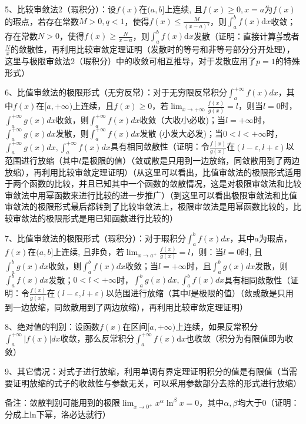 5、比较审敛法2（瑕积分）：设$f(x)$在$(a, b]$上连续, 且$f(x) \geqslant 0, x=a$为$f(x)$的瑕点，若存在常数$M>0, q<1$，使得$f(x) \leqslant \frac{M}{(x-a)^{q}}$，则$\int_{a}^{b} f(x) \mathrm{d} x$收敛；存在常数$N>0$，使得$f(x) \geqslant \frac{N}{x-a}$，则$\int_{a}^{b} f(x) \mathrm{d} x$发散（证明：直接计算$\frac{M}{x^{p}}$或者$\frac{N}{x}$的敛散性，再利用比较审敛定理证明（发散时的等号和非等号部分分开处理），这里与极限审敛法2（瑕积分）中的收敛可相互推导，对于发散应用了$p=1$的特殊形式）

6、比值审敛法的极限形式（无穷反常）：对于无穷限反常积分$\int_{a}^{+\infty} f(x) d x$，其中$f(x)$在$[{a},+\infty)$上连续，且$f(x) \geqslant 0$，若$\lim_{x \rightarrow+\infty} \frac{f(x)}{g(x)}=l$，则当$l=0$时，$\int_{a}^{+\infty} g(x) d x$收敛，则$\int_{a}^{+\infty} f(x) d x$收敛（大收小必收)；当$l=+\infty$时，$\int_{a}^{+\infty} g(x) d x$发散，则$\int_{a}^{+\infty} f(x) d x$发散 (小发大必发)；当$0<l<+\infty$时，$\int_{a}^{+\infty} g(x) d x,\int_{a}^{+\infty} f(x) d x$具有相同敛散性（证明：令$\frac{f(x)}{g(x)}$在$(l-\varepsilon,l+\varepsilon)$以范围进行放缩（其中$l$是极限的值）（敛或散是只用到一边放缩，同敛散用到了两边放缩），再利用比较审敛定理证明）（从这里可以看出，比值审敛法的极限形式适用于两个函数的比较，并且已知其中一个函数的敛散情况，这是对极限审敛法和比较审敛法中用幂函数来进行比较的进一步推广）（到这里可以看出极限审敛法和比值审敛法的极限形式最后都转到了比较审敛法上，极限审敛法是用幂函数比较的，比较审敛法的极限形式是用已知函数进行比较的）

7、比值审敛法的极限形式（瑕积分）：对于瑕积分$\int_{a}^{b} f(x) d x$，其中$a$为瑕点，$f(x)$在$({a}, {b}]$上连续, 且非负，若$\lim_{x \rightarrow a^{+}} \frac{f(x)}{g(x)}=l$，则：当$l=0$时, 且 $\int_{a}^{b} g(x) d x$收敛，则$\int_{a}^{b} f(x) d x$收敛；当$l =+\infty$时，且$\int_{a}^{b} g(x) d x$发散，则$\int_{a}^{b} f(x) d x$发散；$0<l<+\infty$时，$\int_{a}^{b} g(x) d x, \int_{a}^{b} f(x) d x$具有相同敛散性（证明：令$\frac{f(x)}{g(x)}$在$(l-\varepsilon,l+\varepsilon)$以范围进行放缩（其中$l$是极限的值）（敛或散是只用到一边放缩，同敛散用到了两边放缩），再利用比较审敛定理证明）

8、绝对值的判别：设函数$f(x)$在区间$[a,+\infty)$上连续，如果反常积分$\int_{a}^{+\infty}|f(x)| d x$收敛，那么反常积分$\int_{a}^{+ \infty} f(x) \mathrm{d} x$也收敛（积分为有限值即为收敛）

9、其它情况：对式子进行放缩，利用单调有界定理证明积分的值是有限值（当需要证明放缩的式子的收敛性与参数无关，可以采用参数部分去除的形式进行放缩）

备注：敛散判别可能用到的极限$\lim _{x \rightarrow 0^{+}} x^{\alpha} \ln ^{\beta} x=0$，其中${\alpha},{\beta}$均大于0（证明：分成上ln下幂，洛必达就行）

